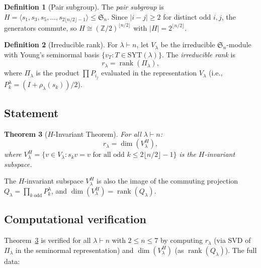 \documentclass[11pt]{article}
\newtheorem{theorem}{Theorem}
\theoremstyle{definition}
\newtheorem{definition}[theorem]{Definition}
\theoremstyle{remark}
\newcommand{\ZZ}{\mathbb{Z}}
\newcommand{\Sym}{\mathfrak{S}}
\newcommand{\rk}{\operatorname{rank}}
\begin{document}
\begin{definition}[Pair subgroup]
The \emph{pair subgroup} is $H = \langle s_1, s_3, s_5, \ldots,
s_{2\lfloor n/2\rfloor - 1}\rangle \le \Sym_n$. Since
$|i - j| \ge 2$ for distinct odd $i,j$, the generators commute,
so $H \cong (\ZZ/2)^{\lfloor n/2\rfloor}$ with $|H| = 2^{\lfloor n/2\rfloor}$.
\end{definition}

\begin{definition}[Irreducible rank]
For $\lambda \vdash n$, let $V_\lambda$ be the irreducible $\Sym_n$-module
with Young's seminormal basis $\{v_T : T \in \mathrm{SYT}(\lambda)\}$.
The \emph{irreducible rank} is
\[
  r_\lambda = \rk(\Pi_\lambda),
\]
where $\Pi_\lambda$ is the product $\prod P_{i_j}$ evaluated in the
representation $V_\lambda$ (i.e., $P_k^\lambda = (I + \rho_\lambda(s_k))/2$).
\end{definition}


\subsection{Statement}

\begin{theorem}[$H$-Invariant Theorem]
\label{thm:main}
For all $\lambda \vdash n$:
\[
  r_\lambda = \dim(V_\lambda^H),
\]
where $V_\lambda^H = \{v \in V_\lambda : s_k v = v \text{ for all odd }
k \le 2\lfloor n/2\rfloor - 1\}$ is the $H$-invariant subspace.
\end{theorem}

\noindent The $H$-invariant subspace $V_\lambda^H$ is also the image of
the commuting projection $Q_\lambda = \prod_{k\;\mathrm{odd}} P_k^\lambda$,
and $\dim(V_\lambda^H) = \rk(Q_\lambda)$.


\subsection{Computational verification}

Theorem~\ref{thm:main} is verified for all $\lambda \vdash n$ with
$2 \le n \le 7$ by computing $r_\lambda$ (via SVD of $\Pi_\lambda$ in
the seminormal representation) and $\dim(V_\lambda^H)$ (as
$\rk(Q_\lambda)$). The full data:
\end{document}
